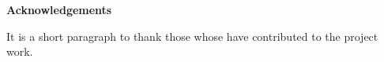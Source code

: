 
\mbox{}\newline\vspace{10mm} \mbox{}\LARGE
%
{\bf Acknowledgements} \normalsize \vspace{5mm}

It is a short paragraph to thank those whose have contributed to the project work.
